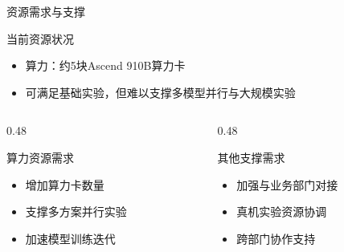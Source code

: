 \documentclass[aspectratio=169,11pt]{beamer}
\begin{document}
\begin{frame}{资源需求与支撑}
    \begin{block}{当前资源状况}
        \begin{itemize}
            \item 算力：约5块Ascend 910B算力卡
            \item 可满足基础实验，但难以支撑多模型并行与大规模实验
        \end{itemize}
    \end{block}
    
    \vspace{0.3cm}
    
    \begin{columns}[T]
        \begin{column}{0.48\textwidth}
            \begin{block}{算力资源需求}
                \begin{itemize}
                    \item 增加算力卡数量
                    \item 支撑多方案并行实验
                    \item 加速模型训练迭代
                \end{itemize}
            \end{block}
        \end{column}
        \begin{column}{0.48\textwidth}
            \begin{block}{其他支撑需求}
                \begin{itemize}
                    \item 加强与业务部门对接
                    \item 真机实验资源协调
                    \item 跨部门协作支持
                \end{itemize}
            \end{block}
        \end{column}
    \end{columns}
\end{frame}

\end{document}
